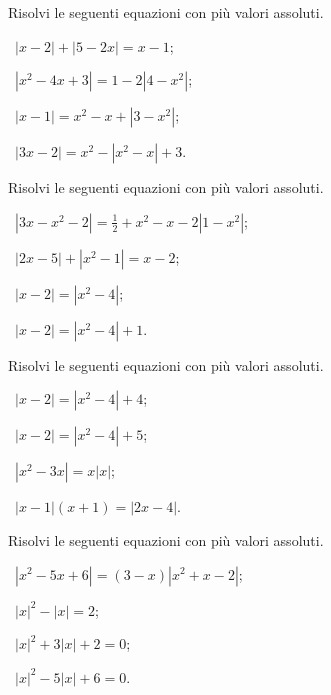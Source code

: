 \begin{esercizio}[\Ast]
 \label{ese:7.16}
Risolvi le seguenti equazioni con più valori assoluti.
\begin{multicols}{2}
 \begin{enumeratea}
 \item~$\left|x-2\right|+\left|5-2x\right|=x-1$;
 \item~$\left|x^2-4x+3\right|=1-2\left|4-x^2\right|$;
 \item~$\left|x-1\right|=x^2-x+\left|3-x^2\right|$;
 \item~$\left|3x-2\right|=x^2-\left|x^2-x\right|+3$.
 \end{enumeratea}
 \end{multicols}
\end{esercizio}
\pagebreak
\begin{esercizio}[\Ast]
 \label{ese:7.17}
Risolvi le seguenti equazioni con più valori assoluti.
\begin{multicols}{2}
 \begin{enumeratea}
 \item~$\left|3x-x^2-2\right|=\frac 1 2+x^2-x-2\left|1-x^2\right|$;
 \item~$\left|2x-5\right|+\left|x^2-1\right|=x-2$;
 \item~$\left|x-2\right|=\left|x^2-4\right|$;
 \item~$\left|x-2\right|=\left|x^2-4\right|+1$.
 \end{enumeratea}
 \end{multicols}
\end{esercizio}

\begin{esercizio}[\Ast]
 \label{ese:7.18}
Risolvi le seguenti equazioni con più valori assoluti.
\begin{multicols}{2}
 \begin{enumeratea}
 \item~$\left|x-2\right|=\left|x^2-4\right|+4$;
 \item~$\left|x-2\right|=\left|x^2-4\right|+5$;
 \item~$\left|x^2-3x\right|=x\left|x\right|$;
 \item~$\left|x-1\right|(x+1)=\left|2x-4\right|$.
 \end{enumeratea}
 \end{multicols}
\end{esercizio}

\begin{esercizio}[\Ast]
 \label{ese:7.19}
Risolvi le seguenti equazioni con più valori assoluti.
\begin{multicols}{2}
 \begin{enumeratea}
 \item~$\left|x^2-5x+6\right|=(3-x)\left|x^2+x-2\right|$;
 \item~$\left|x\right|^2-\left|x\right|=2$;
 \item~$\left|x\right|^2+3\left|x\right|+2=0$;
 \item~$\left|x\right|^2-5\left|x\right|+6=0$.
 \end{enumeratea}
 \end{multicols}
\end{esercizio}

